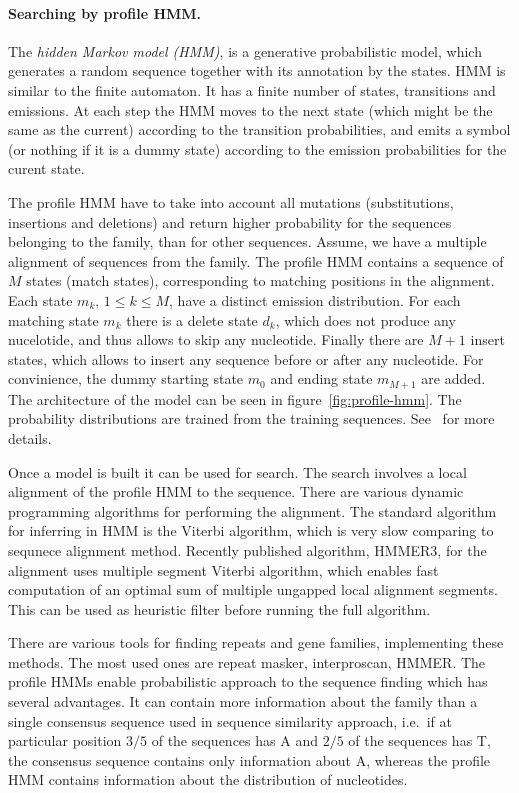 \paragraph{Searching by profile HMM.}
The \emph{hidden Markov model (HMM)}, is a generative probabilistic model, which generates a random sequence together with its annotation by the states. HMM is similar to the finite automaton. It has a finite number of states, transitions and emissions. At each step the HMM moves to the next state (which might be the same as the current) according to the transition probabilities, and emits a symbol (or nothing if it is a dummy state) according to the emission probabilities for the curent state.

The profile HMM have to take into account all mutations (substitutions, insertions and deletions) and return higher probability for the sequences belonging to the family, than for other sequences.
Assume, we have a multiple alignment of sequences from the family. The profile HMM\cite{profile-hmm} contains a sequence of $M$ states (match states), corresponding to matching positions in the alignment. Each state $m_k,\, 1 \leq k \leq M$, have a distinct emission distribution.
For each matching state $m_k$ there is a delete state $d_k$, which does not produce any nucelotide, and thus allows to skip any nucleotide. Finally there are $M+1$ insert states, which allows to insert any sequence before or after any nucleotide. For convinience, the dummy starting state $m_0$ and ending state $m_{M+1}$ are added.
The architecture of the model can be seen in figure~\ref{fig:profile-hmm}. The probability distributions are trained from the training sequences. See~\cite{profile-hmm} for more details.

Once a model is built it can be used for search. The search involves a local alignment of the profile HMM to the sequence.
There are various dynamic programming algorithms for performing the alignment. The standard algorithm for inferring in HMM is the Viterbi algorithm, which is very slow comparing to sequnece alignment method\cite{eddy2011accelerated}. Recently published algorithm, HMMER3\cite{eddy2011accelerated}, for the alignment uses multiple segment Viterbi algorithm\cite{eddy2011accelerated}, which enables fast computation of an optimal sum of multiple ungapped local
alignment segments. This can be used as heuristic filter before running the full algorithm.

There are various tools for finding repeats and gene families, implementing these methods.
The most used ones are repeat masker\cite{repeatmasker}, interproscan\cite{mitchell2015interpro}, HMMER\cite{eddy2011accelerated}.
The profile HMMs enable probabilistic approach to the sequence finding which has several advantages. It can contain more information about the family than a single consensus sequence used in sequence similarity approach, i.e.\ if at particular position $3/5$ of the sequences has A and $2/5$ of the sequences has T, the consensus sequence contains only information about A, whereas the profile HMM contains information about the distribution of nucleotides.

